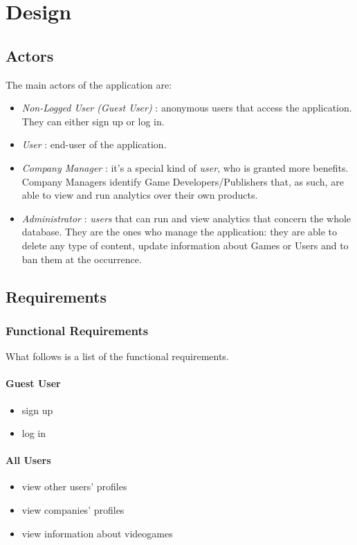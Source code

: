 \chapter{Design}
\section{Actors}
The main actors of the application are: 
\begin{itemize}
	\item \emph{Non-Logged User (Guest User)} : anonymous users that access the application. They can either sign up or log in.
	\item \emph{User} : end-user of the application.
	\item \emph{Company Manager} : it's a special kind of \emph{user}, who is granted more benefits. Company Managers identify Game Developers/Publishers that, as such, are able to view and run analytics over their own products. 
	\item \emph{Administrator} : \emph{users} that can run and view analytics that concern the whole database. They are the ones who manage the application: they are able to delete any type of content, update information about Games or Users and to ban them at the occurrence. 
\end{itemize}
\section{Requirements}
\subsection{Functional Requirements}
What follows is a list of the functional requirements.
\subsubsection{Guest User}
\begin{itemize}
	\item sign up
        \item log in
\end{itemize}
\subsubsection{All Users}
\begin{itemize}
	\item view other users' profiles
	\item view companies' profiles
	\item view information about videogames
\end{itemize}
